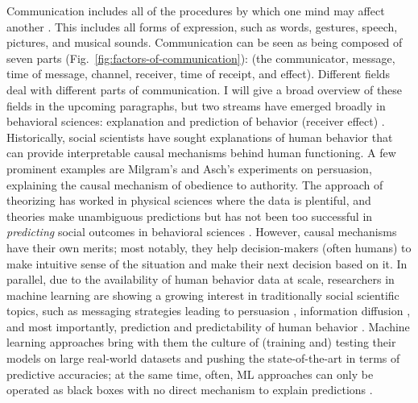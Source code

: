 \documentclass[hidelinks,11pt,a4paper]{report}
\renewcommand{\cite}[1]{\citep{#1}}
\begin{document}
Communication includes all of the procedures by which one mind may affect another \cite{shannon-weaver-1949}. This includes all forms of expression, such as words, gestures, speech, pictures, and musical sounds.
Communication can be seen as being composed of seven parts (Fig.~\ref{fig:factors-of-communication}): (the communicator, message, time of message, channel, receiver, time of receipt, and effect). Different fields deal with different parts of communication. I will give a broad overview of these fields in the upcoming paragraphs, but two streams have emerged broadly in behavioral sciences: explanation and prediction of behavior (receiver effect) \cite{breiman2001statistical,hofman2017prediction,shmueli2010explain}. Historically, social scientists have sought explanations of human behavior that can provide interpretable causal mechanisms behind human functioning. A few prominent examples are Milgram's \cite{milgram1978obedience} and Asch's \cite{asch1948doctrine} experiments on persuasion, explaining the causal mechanism of obedience to authority. The approach of theorizing has worked in physical sciences where the data is plentiful, and theories make unambiguous predictions but has not been too successful in \textit{predicting} social outcomes in behavioral sciences \cite{open2015estimating,tetlock2017expert,forecasting2023insights}. However, causal mechanisms have their own merits; most notably, they help decision-makers (often humans) to make intuitive sense of the situation and make their next decision based on it. In parallel, due to the availability of human behavior data at scale, researchers in machine learning are showing a growing interest in traditionally social scientific topics, such as messaging strategies leading to persuasion \cite{habernal2016makes,kumar2023persuasion,luu2019measuring,bhattacharyya-etal-2023-video}, information diffusion \cite{cheng2014can,martin2016exploring}, and most importantly, prediction and predictability of human behavior \cite{choi2012predicting,song2010limits}. Machine learning approaches bring with them the culture of (training and) testing their models on large real-world datasets and pushing the state-of-the-art in terms of predictive accuracies; at the same time, often, ML approaches can only be operated as black boxes with no direct mechanism to explain predictions \cite{XXX}.
\end{document}
